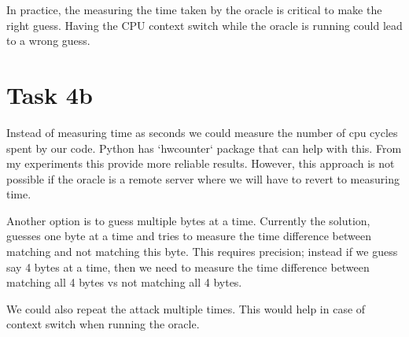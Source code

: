 \documentclass{article}
\begin{document}
    In practice, the measuring the time taken by the oracle is critical to make the right guess. Having the CPU context switch while the oracle is running could lead to a wrong guess.

    \section*{Task 4b}
    Instead of measuring time as seconds we could measure the number of cpu cycles spent by our code. Python has `hwcounter` package that can help with this. From my experiments this provide more reliable results. However, this approach is not possible if the oracle is a remote server where we will have to revert to measuring time.

    Another option is to guess multiple bytes at a time. Currently the solution, guesses one byte at a time and tries to measure the time difference between matching and not matching this byte. This requires precision; instead if we guess say 4 bytes at a time, then we need to measure the time difference between matching all 4 bytes vs not matching all 4 bytes.

    We could also repeat the attack multiple times. This would help in case of context switch when running the oracle.
\end{document}
